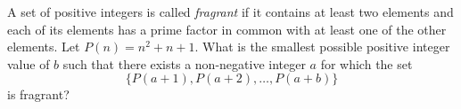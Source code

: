 A set of positive integers is called \emph{fragrant}
if it contains at least two elements and each of its elements
has a prime factor in common with at least one of the other elements.
Let $P(n)=n^2+n+1$.
What is the smallest possible positive integer value of $b$ such that
there exists a non-negative integer $a$ for which the set
\[ \{P(a+1),P(a+2),\dots,P(a+b)\} \]
is fragrant?